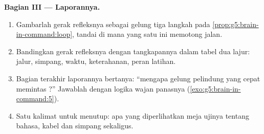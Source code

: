 \begin{problem}
\medskip\noindent\textbf{Bagian III --- Laporannya.}
\begin{enumerate}[resume]
  \item Gambarlah gerak refleksnya sebagai gelung tiga
        langkah pada \cref{prop:g5:brain-in-command:loop},
        tandai di mana yang satu ini memotong jalan.
  \item Bandingkan gerak refleksnya dengan tangkapannya
        dalam tabel dua lajur: jalur, simpang, waktu,
        keterahanan, peran latihan.
  \item Bagian terakhir laporannya bertanya: ``mengapa
        gelung pelindung yang cepat memintas ?''
        Jawablah dengan logika wajan panasnya
        (\cref{exo:g5:brain-in-command:5}).
  \item Satu kalimat untuk menutup: apa yang diperlihatkan
        meja ujinya tentang bahasa, kabel dan simpang  sekaligus.
\end{enumerate}
\end{problem}
